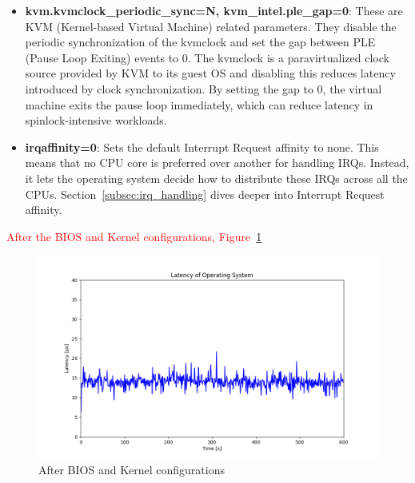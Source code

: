 \documentclass[MMR,Master,english]{twbook}
\begin{document}
\begin{itemize}
	\item \textbf{kvm.kvmclock\_periodic\_sync=N, kvm\_intel.ple\_gap=0}: These are KVM (Kernel-based Virtual Machine) related parameters. They disable the periodic synchronization of the kvmclock and set the gap between PLE (Pause Loop Exiting) events to 0. The kvmclock is a paravirtualized clock source provided by KVM to its guest OS and disabling this reduces latency introduced by clock synchronization. By setting the gap to 0, the virtual machine exits the pause loop immediately, which can reduce latency in spinlock-intensive workloads.
	\item \textbf{irqaffinity=0}: Sets the default Interrupt Request affinity to none. This means that no CPU core is preferred over another for handling IRQs. Instead, it lets the operating system decide how to distribute these IRQs across all the CPUs. Section~\ref{subsec:irq_handling} dives deeper into Interrupt Request affinity.
\end{itemize}

\textcolor{red}{After the BIOS and Kernel configurations, Figure~\ref{fig:max_latency_rt_kernelparam}}

\begin{figure}[H]
	\centering
	\includegraphics[width=1.0\columnwidth]{masterthesis-documentation/docs/sigmatek/xenomai/4rt_kernelparam/max_latency_rt_kernelparam/max_latency_rt_kernelparam.png}
	\caption[After BIOS and Kernel configurations]{After BIOS and Kernel configurations}
	\label{fig:max_latency_rt_kernelparam}
\end{figure}
\end{document}
